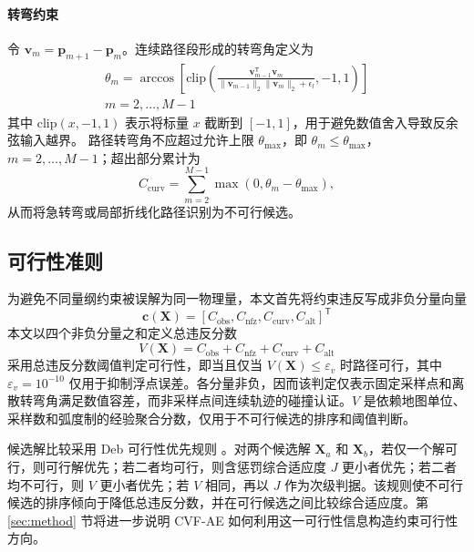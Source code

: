 \paragraph{转弯约束}
令 $\mathbf v_m=\mathbf p_{m+1}-\mathbf p_m$。连续路径段形成的转弯角定义为
\begin{equation}
    \begin{aligned}
    \theta_m=
    \arccos
    \left[
    \mathrm{clip}\left(
    \frac{\mathbf v_{m-1}^\mathsf{T}\mathbf v_m}
    {\|\mathbf v_{m-1}\|_2\|\mathbf v_m\|_2+\epsilon_l},
    -1,1
    \right)
    \right]\\
    m=2,\ldots,M-1
    \end{aligned}
    \label{eq:turning-angle}
\end{equation}
其中 $\mathrm{clip}(x,-1,1)$ 表示将标量 $x$ 截断到 $[-1,1]$，用于避免数值舍入导致反余弦输入越界。
路径转弯角不应超过允许上限 $\theta_{\max}$，即 $\theta_m \leq \theta_{\max}$，$m=2,\ldots,M-1$；超出部分累计为
\begin{equation}
    C_{\mathrm{curv}}=\sum_{m=2}^{M-1}\max(0,\theta_m-\theta_{\max}),
    \label{eq:curvature-violation}
\end{equation}
从而将急转弯或局部折线化路径识别为不可行候选。

\subsection{可行性准则}

为避免不同量纲约束被误解为同一物理量，本文首先将约束违反写成非负分量向量
\begin{equation}
    \mathbf c(\mathbf X)=
    \left[
    C_{\mathrm{obs}},
    C_{\mathrm{nfz}},
    C_{\mathrm{curv}},
    C_{\mathrm{alt}}
    \right]^\mathsf T
    \label{eq:constraint-vector}
\end{equation}
本文以四个非负分量之和定义总违反分数
\begin{equation}
    V(\mathbf{X}) =
    C_{\mathrm{obs}} + C_{\mathrm{nfz}} + C_{\mathrm{curv}} + C_{\mathrm{alt}}
    \label{eq:total-violation}
\end{equation}
采用总违反分数阈值判定可行性，即当且仅当 $V(\mathbf{X})\leq\varepsilon_v$ 时路径可行，其中 $\varepsilon_v=10^{-10}$ 仅用于抑制浮点误差。各分量非负，因而该判定仅表示固定采样点和离散转弯角满足数值容差，而非采样点间连续轨迹的碰撞认证。$V$ 是依赖地图单位、采样数和弧度制的经验聚合分数，仅用于不可行候选的排序和阈值判断。

候选解比较采用 Deb 可行性优先规则 \citep{Deb2000ConstraintHandling}。对两个候选解 $\mathbf{X}_a$ 和 $\mathbf{X}_b$，若仅一个解可行，则可行解优先；若二者均可行，则含惩罚综合适应度 $J$ 更小者优先；若二者均不可行，则 $V$ 更小者优先；若 $V$ 相同，再以 $J$ 作为次级判据。该规则使不可行候选的排序倾向于降低总违反分数，并在可行候选之间比较综合适应度。第 \ref{sec:method} 节将进一步说明 CVF-AE 如何利用这一可行性信息构造约束可行性方向。
